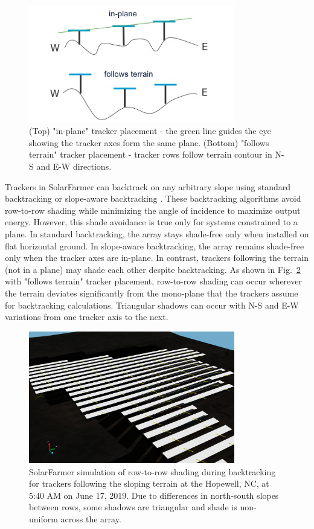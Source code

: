 \documentclass[conference]{IEEEtran}
\begin{document}
\begin{figure}[htbp]
\centerline{\includegraphics[width=9cm]{tracker-placement.jpg}}
\caption{(Top) "in-plane" tracker placement - the green line guides the eye showing the tracker axes form the same plane. (Bottom) "follows terrain" tracker placement - tracker rows follow terrain contour in N-S and E-W directions.}
\label{tracker-placement}
\end{figure}

Trackers in SolarFarmer can backtrack on any arbitrary slope using standard backtracking or slope-aware backtracking \cite{Anderson2020}. These backtracking algorithms avoid row-to-row shading while minimizing the angle of incidence to maximize output energy. However, this shade avoidance is true only for systems constrained to a plane. In standard backtracking, the array stays shade-free only when installed on flat horizontal ground. In slope-aware backtracking, the array remains shade-free only when the tracker axes are in-plane. In contrast, trackers following the terrain (not in a plane) may shade each other despite backtracking. As shown in Fig.~\ref{terrain-shade} with "follows terrain" tracker placement, row-to-row shading can occur wherever the terrain deviates significantly from the mono-plane that the trackers assume for backtracking calculations. Triangular shadows can occur with N-S and E-W variations from one tracker axis to the next. 

\begin{figure}[htbp]
\centerline{\includegraphics[width=9cm]{Hopewell-Friends-SolarFarmer-shade-follows-std.png}}
\caption{SolarFarmer simulation of row-to-row shading during backtracking for trackers following the sloping terrain at the Hopewell, NC, at 5:40 AM on June 17, 2019. Due to differences in north-south slopes between rows, some shadows are triangular and shade is non-uniform across the array.}
\label{terrain-shade}
\end{figure}
\end{document}
